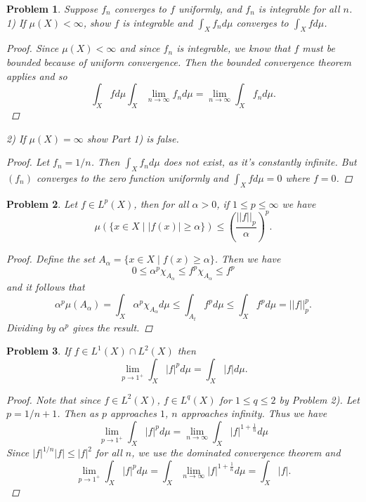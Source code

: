 \documentclass{article}
\newtheorem{problem}{Problem}
\newcommand{\dmu}{d\mu}
\begin{document}
\begin{problem}
Suppose $f_n$ converges to $f$ uniformly, and $f_n$ is integrable for all $n$.\\
1) If $\mu(X) < \infty$, show $f$ is integrable and $\int_X f_n \dmu$ converges to $\int_X f \dmu$.
\begin{proof}
Since $\mu(X) < \infty$ and since $f_n$ is integrable, we know that $f$ must be bounded because of uniform convergence. Then the bounded convergence theorem applies and so
\[
\int_X f \dmu \int_X \lim_{n \rightarrow \infty} f_n \dmu = \lim_{n \rightarrow \infty} \int_X f_n \dmu.
\]
\end{proof}
2) If $\mu(X) = \infty$ show Part 1) is false.
\begin{proof}
Let $f_n = 1/n$. Then $\int_X f_n \dmu$ does not exist, as it's constantly infinite. But $(f_n)$ converges to the zero function uniformly and $\int_X f \dmu = 0$ where $f = 0$.
\end{proof}
\end{problem}

\begin{problem}
Let $f \in L^p(X)$, then for all $\alpha > 0$, if $1 \leq p \leq \infty$ we have
\[
\mu(\{x \in X \mid |f(x)| \geq \alpha\}) \leq \left ( \frac{||f||_p}{\alpha} \right )^p.
\]
\begin{proof}
Define the set $A_{\alpha} = \{x \in X \mid f(x) \geq \alpha\}$. Then we have
\[
0 \leq \alpha^p \chi_{A_{\alpha}} \leq f^p \chi_{A_{\alpha}} \leq f^p
\]
and it follows that
\[
\alpha^p \mu(A_{\alpha}) = \int_X \alpha^p \chi_{A_{\alpha}} \dmu \leq \int_{A_t} f^p \dmu \leq \int_X f^p \dmu = ||f||_p^p.
\]
Dividing by $\alpha^p$ gives the result.
\end{proof}
\end{problem}

\begin{problem}
If $f \in L^1(X) \cap L^2(X)$ then
\[
\lim_{p \rightarrow 1^+} \int_X |f|^p \dmu = \int_X |f| \dmu.
\]
\begin{proof}
Note that since $f \in L^2(X)$, $f \in L^q(X)$ for $1 \leq q \leq 2$ by Problem 2). Let $p = 1/n + 1$. Then as $p$ approaches $1$, $n$ approaches infinity. Thus we have
\[
\lim_{p \rightarrow 1^+} \int_X |f|^p \dmu = \lim_{n \rightarrow \infty} \int_X |f|^{1+\frac{1}{n}} \dmu
\]
Since $|f|^{1/n}|f| \leq |f|^2$ for all $n$, we use the dominated convergence theorem and
\[
\lim_{p \rightarrow 1^+} \int_X |f|^p \dmu = \int_X \lim_{n \rightarrow \infty} |f|^{1+\frac{1}{n}} \dmu = \int_X |f|.
\]
\end{proof}
\end{problem}
\end{document}
